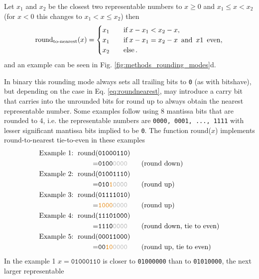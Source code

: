 Let $x_1$ and $x_2$ be the closest two representable numbers to $x \geq 0 $ and $x_1 \leq x < x_2$ (for $x<0$ this changes
to $x_1 < x \leq x_2$) then
\begin{equation}
\operatorname{round}_{\operatorname{to-nearest}}(x) =
\begin{cases}
x_1 \quad &\operatorname{if} x - x_1 < x_2 - x,  \\
x_1 &\operatorname{if} x-x_1 = x_2 - x \operatorname{~and~} x1 \operatorname{~even}, \\
x_2 &\operatorname{else}.
\end{cases}
\label{eq:roundnearest}
\end{equation}
and an example can be seen in Fig. \ref{fig:methods_rounding_modes}d.

In binary this rounding mode always sets all trailing bits to \texttt{0} (as with bitshave), but depending on the case in Eq. \ref{eq:roundnearest},
may introduce a carry bit that carries into the unrounded bits for round up to always obtain the nearest representable number.
Some examples follow using 8 mantissa bits that are rounded to 4, i.e. the representable numbers are \texttt{0000, 0001, ..., 1111}
with lesser significant mantissa bits implied to be \texttt{0}. The function round($x$) implements round-to-nearest tie-to-even
in these examples
\begin{align}
	\text{Example 1: }\op{round}(&\mathtt{01000110}) \nonumber \\
						= &\mathtt{0100{\color{gray}0000}} \qquad \text{(round down)} \nonumber \\
	\text{Example 2: }\op{round}(&\mathtt{01001110}) \nonumber \\
						= &\mathtt{010{\color{pregime}1}{\color{gray}0000}} \qquad \text{(round up)} \nonumber \\
	\text{Example 3: }\op{round}(&\mathtt{01111010}) \nonumber \\
						= &\mathtt{{\color{pregime}1000}{\color{gray}0000}} \qquad \text{(round up)} \nonumber \\
	\text{Example 4: }\op{round}(&\mathtt{11101000}) \nonumber \\
						= &\mathtt{1110{\color{gray}0000}} \qquad \text{(round down, tie to even)} \nonumber \\
	\text{Example 5: }\op{round}(&\mathtt{00011000}) \nonumber \\
						= &\mathtt{00{\color{pregime}10}{\color{gray}0000}} \qquad \text{(round up, tie to even)}					
	\label{eq:roundnearest_binary}
\end{align}
In the example 1 $x = \mathtt{01000110}$ is closer to \texttt{01000000} than to \texttt{01010000}, the next larger representable
